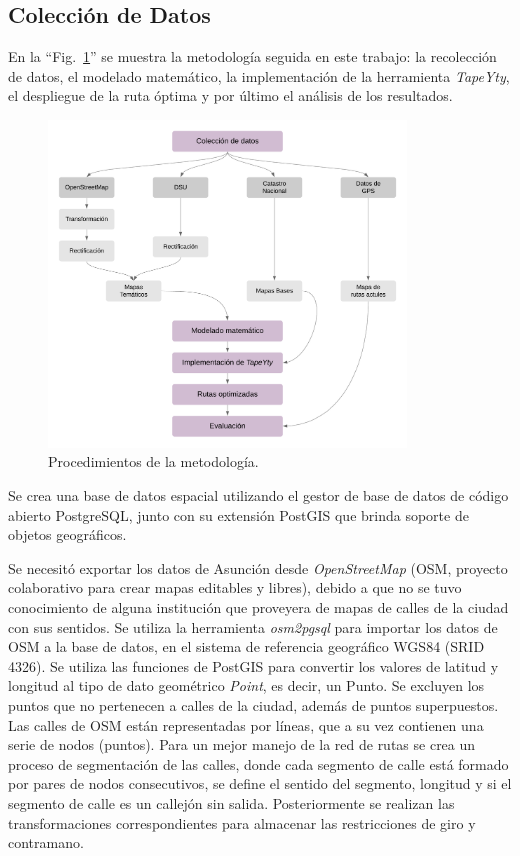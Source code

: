 \documentclass[spanish, conference]{IEEEtran}
\begin{document}
\subsection{Colección de Datos}

En la ``Fig.~\ref{fig:metodologia}'' se muestra la metodología seguida en este trabajo: la recolección de datos, el modelado matemático, la implementación de la herramienta \textit{TapeYty}, el despliegue de la ruta óptima y por último el análisis de los resultados.

\begin{figure}[tbp]
\centerline{\includegraphics[width=9.5cm]{imagenes/DiagramaDeMetodologia.png}}
\caption{Procedimientos de la metodología.}
\label{fig:metodologia}
\end{figure}

Se crea una base de datos espacial utilizando el gestor de base de datos de código abierto PostgreSQL, junto con su extensión PostGIS que brinda soporte de objetos geográficos.

Se necesitó exportar los datos de Asunción desde \textit{OpenStreetMap} (OSM, proyecto colaborativo para crear mapas editables y libres), debido a que no se tuvo conocimiento de alguna institución que proveyera de mapas de calles de la ciudad con sus sentidos. Se utiliza la herramienta \textit{osm2pgsql} para importar los datos de OSM a la base de datos, en el sistema de referencia geográfico WGS84 (SRID 4326). Se utiliza las funciones de PostGIS para convertir los valores de latitud y longitud al tipo de dato geométrico \textit{Point}, es decir, un Punto. Se excluyen los puntos que no pertenecen a calles de la ciudad, además de puntos superpuestos. Las calles de OSM están representadas por líneas, que a su vez contienen una serie de nodos (puntos). Para un mejor manejo de la red de rutas se crea un proceso de segmentación de las calles, donde cada segmento de calle está formado por pares de nodos consecutivos, se define el sentido del segmento, longitud y si el segmento de calle es un callejón sin salida. Posteriormente se realizan las transformaciones correspondientes para almacenar las restricciones de giro y contramano.
\end{document}

